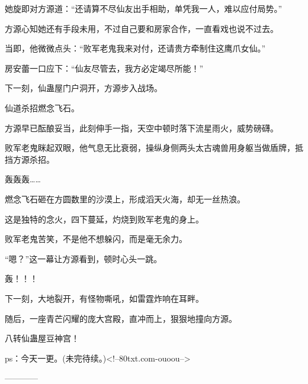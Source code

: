 \begin{this_body}
她旋即对方源道：“还请算不尽仙友出手相助，单凭我一人，难以应付局势。”

方源心知她还有手段未用，不过自己要和房家合作，一直看戏也说不过去。

当即，他微微点头：“败军老鬼我来对付，还请贵方牵制住这鹰爪女仙。”

房安蕾一口应下：“仙友尽管去，我方必定竭尽所能！”

下一刻，仙蛊屋门户洞开，方源步入战场。

仙道杀招燃念飞石。

方源早已酝酿妥当，此刻伸手一指，天空中顿时落下流星雨火，威势磅礴。

败军老鬼眯起双眼，他气息无比衰弱，操纵身侧两头太古魂兽用身躯当做盾牌，抵挡方源杀招。

轰轰轰……

燃念飞石砸在方圆数里的沙漠上，形成滔天火海，却无一丝热浪。

这是独特的念火，四下蔓延，灼烧到败军老鬼的身上。

败军老鬼苦笑，不是他不想躲闪，而是毫无余力。

“嗯？”这一幕让方源看到，顿时心头一跳。

轰！！！

下一刻，大地裂开，有怪物嘶吼，如雷霆炸响在耳畔。

随后，一座青芒闪耀的庞大宫殿，直冲而上，狠狠地撞向方源。

八转仙蛊屋豆神宫！

ps：今天一更。(未完待续。)<!--80txt.com-ouoou-->

------------

\end{this_body}

